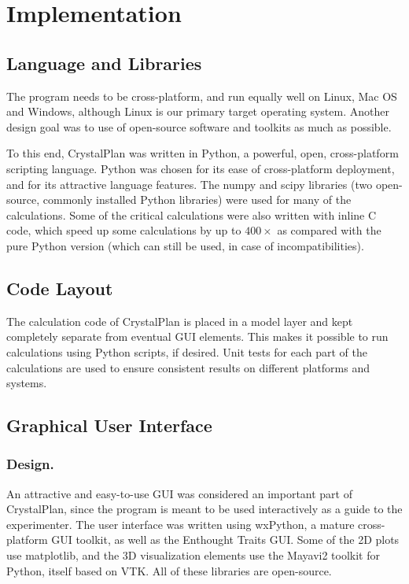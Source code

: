 \documentclass[draft]{iucr}              %
\begin{document}
\section{Implementation}




\subsection{Language and Libraries}

The program needs to be cross-platform, and run equally well on Linux, Mac OS
and Windows, although Linux is our primary target operating system. Another
design goal was to use of open-source software and toolkits as much as possible. 

To this end, CrystalPlan was written in Python, a powerful, open, cross-platform
scripting language. Python was chosen for its ease of cross-platform deployment, and for
its attractive language features. The numpy and scipy libraries (two
open-source, commonly installed Python libraries) were used for many of the
calculations. Some of the critical calculations were also written with inline C
code, which speed up some calculations by up to $400\times$ as compared with
the pure Python version (which can still be used, in case of incompatibilities).       

\subsection{Code Layout}

The calculation code of CrystalPlan is placed in a model layer and kept
completely separate from eventual GUI elements. This makes it possible to run
calculations using Python scripts, if desired. Unit tests for each part of the
calculations are used to ensure consistent results on different platforms and
systems.     
 

\subsection{Graphical User Interface}

\subsubsection{Design.}

An attractive and easy-to-use GUI was considered an important part of
CrystalPlan, since the program is meant to be used interactively as a guide to
the experimenter. The user interface was written using wxPython, a mature
cross-platform GUI toolkit, as well as the Enthought Traits GUI. Some of the 2D
plots use matplotlib, and the 3D visualization elements use the Mayavi2 toolkit
for Python, itself based on VTK. All of these libraries are open-source.       
\end{document}
